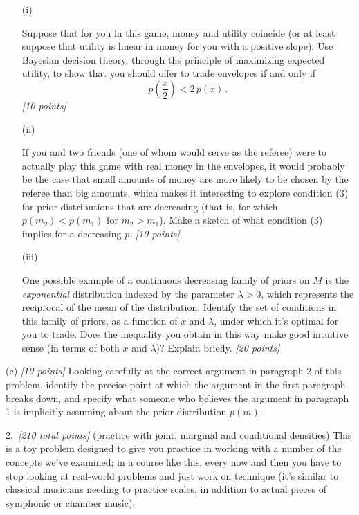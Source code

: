 \documentclass[12pt]{article}
\begin{document}
\begin{itemize}

\item[(i)]

Suppose that for you in this game, money and
utility coincide (or at least suppose that utility is linear in money for
you with a positive slope). Use Bayesian decision theory, through the
principle of maximizing expected utility, to show that you should offer to
trade envelopes if and only if
\begin{equation} \label{e:meu-1}
p \! \left( \frac{ x }{ 2 } \right) < 2 \, p ( x ) \, . 
\end{equation} 
\textit{[10 points]}

\item[(ii)]

If you and two friends (one of whom would serve as the referee) were to
actually play this game with real money in the envelopes, it would
probably be the case that small amounts of money are more likely to be
chosen by the referee than big amounts, which makes it interesting to
explore condition (3) for prior distributions that are decreasing (that
is, for which $p ( m_2 ) < p ( m_1 )$ for $m_2 > m_1$). Make a sketch of
what condition (3) implies for a decreasing $p$. \textit{[10 points]}

\item[(iii)]

One possible example of a
continuous decreasing family of priors on $M$ is the \textit{exponential}
distribution indexed by the parameter $\lambda > 0$,
which represents the reciprocal of the mean of the distribution. Identify the set of
conditions in this family of priors, as a function of $x$ and $\lambda$,
under which it's optimal for you to trade. Does the inequality you obtain
in this way make good intuitive sense (in terms of both $x$ and
$\lambda$)? Explain briefly. \textit{[20 points]}

\end{itemize}

(c) \textit{[10 points]} Looking carefully at the correct argument in paragraph 2 of this problem, identify the precise point at which the argument in the
first paragraph breaks down, and specify what someone who believes the
argument in paragraph 1 is implicitly assuming about the prior distribution $p ( m )$. 

2.~\textit{[210 total points]} (practice with joint, marginal and conditional densities) This is a toy problem designed to give you practice in working with a number of the concepts we've examined; in a course like this, every now and then you have to stop looking at real-world problems and just work on technique (it's similar to classical musicians needing to practice scales, in addition to actual pieces of symphonic or chamber music).
\end{document}
